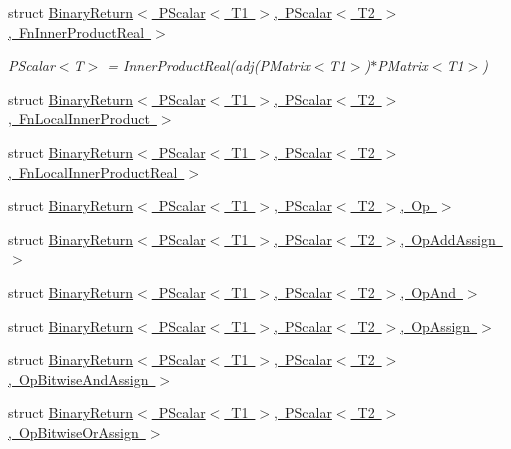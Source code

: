 \begin{DoxyCompactItemize}
struct \mbox{\hyperlink{structENSEM_1_1BinaryReturn_3_01PScalar_3_01T1_01_4_00_01PScalar_3_01T2_01_4_00_01FnInnerProductReal_01_4}{Binary\+Return$<$ P\+Scalar$<$ T1 $>$, P\+Scalar$<$ T2 $>$, Fn\+Inner\+Product\+Real $>$}}
\begin{DoxyCompactList}\small\item\em P\+Scalar$<$\+T$>$ = Inner\+Product\+Real(adj(\+P\+Matrix$<$\+T1$>$)$\ast$\+P\+Matrix$<$\+T1$>$) \end{DoxyCompactList}\item 
struct \mbox{\hyperlink{structENSEM_1_1BinaryReturn_3_01PScalar_3_01T1_01_4_00_01PScalar_3_01T2_01_4_00_01FnLocalInnerProduct_01_4}{Binary\+Return$<$ P\+Scalar$<$ T1 $>$, P\+Scalar$<$ T2 $>$, Fn\+Local\+Inner\+Product $>$}}
\item 
struct \mbox{\hyperlink{structENSEM_1_1BinaryReturn_3_01PScalar_3_01T1_01_4_00_01PScalar_3_01T2_01_4_00_01FnLocalInnerProductReal_01_4}{Binary\+Return$<$ P\+Scalar$<$ T1 $>$, P\+Scalar$<$ T2 $>$, Fn\+Local\+Inner\+Product\+Real $>$}}
\item 
struct \mbox{\hyperlink{structENSEM_1_1BinaryReturn_3_01PScalar_3_01T1_01_4_00_01PScalar_3_01T2_01_4_00_01Op_01_4}{Binary\+Return$<$ P\+Scalar$<$ T1 $>$, P\+Scalar$<$ T2 $>$, Op $>$}}
\item 
struct \mbox{\hyperlink{structENSEM_1_1BinaryReturn_3_01PScalar_3_01T1_01_4_00_01PScalar_3_01T2_01_4_00_01OpAddAssign_01_4}{Binary\+Return$<$ P\+Scalar$<$ T1 $>$, P\+Scalar$<$ T2 $>$, Op\+Add\+Assign $>$}}
\item 
struct \mbox{\hyperlink{structENSEM_1_1BinaryReturn_3_01PScalar_3_01T1_01_4_00_01PScalar_3_01T2_01_4_00_01OpAnd_01_4}{Binary\+Return$<$ P\+Scalar$<$ T1 $>$, P\+Scalar$<$ T2 $>$, Op\+And $>$}}
\item 
struct \mbox{\hyperlink{structENSEM_1_1BinaryReturn_3_01PScalar_3_01T1_01_4_00_01PScalar_3_01T2_01_4_00_01OpAssign_01_4}{Binary\+Return$<$ P\+Scalar$<$ T1 $>$, P\+Scalar$<$ T2 $>$, Op\+Assign $>$}}
\item 
struct \mbox{\hyperlink{structENSEM_1_1BinaryReturn_3_01PScalar_3_01T1_01_4_00_01PScalar_3_01T2_01_4_00_01OpBitwiseAndAssign_01_4}{Binary\+Return$<$ P\+Scalar$<$ T1 $>$, P\+Scalar$<$ T2 $>$, Op\+Bitwise\+And\+Assign $>$}}
\item 
struct \mbox{\hyperlink{structENSEM_1_1BinaryReturn_3_01PScalar_3_01T1_01_4_00_01PScalar_3_01T2_01_4_00_01OpBitwiseOrAssign_01_4}{Binary\+Return$<$ P\+Scalar$<$ T1 $>$, P\+Scalar$<$ T2 $>$, Op\+Bitwise\+Or\+Assign $>$}}
\item 

\end{DoxyCompactItemize}
